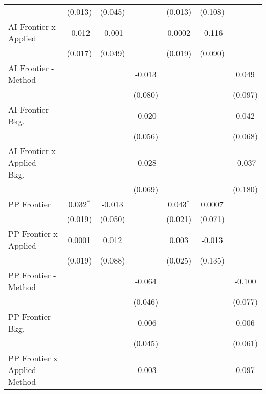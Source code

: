 \begin{tabular}{lcccccc}
                                  & (0.013)     & (0.045) &              & (0.013)      & (0.108) &   \\   
   AI Frontier x Applied          & -0.012      & -0.001  &              & 0.0002       & -0.116  &   \\   
                                  & (0.017)     & (0.049) &              & (0.019)      & (0.090) &   \\   
   AI Frontier - Method           &             &         & -0.013       &              &         & 0.049\\   
                                  &             &         & (0.080)      &              &         & (0.097)\\   
   AI Frontier - Bkg.             &             &         & -0.020       &              &         & 0.042\\   
                                  &             &         & (0.056)      &              &         & (0.068)\\   
   AI Frontier x Applied - Bkg.   &             &         & -0.028       &              &         & -0.037\\   
                                  &             &         & (0.069)      &              &         & (0.180)\\   
   PP Frontier                    & 0.032$^{*}$ & -0.013  &              & 0.043$^{*}$  & 0.0007  &   \\   
                                  & (0.019)     & (0.050) &              & (0.021)      & (0.071) &   \\   
   PP Frontier x Applied          & 0.0001      & 0.012   &              & 0.003        & -0.013  &   \\   
                                  & (0.019)     & (0.088) &              & (0.025)      & (0.135) &   \\   
   PP Frontier - Method           &             &         & -0.064       &              &         & -0.100\\   
                                  &             &         & (0.046)      &              &         & (0.077)\\   
   PP Frontier - Bkg.             &             &         & -0.006       &              &         & 0.006\\   
                                  &             &         & (0.045)      &              &         & (0.061)\\   
   PP Frontier x Applied - Method &             &         & -0.003       &              &         & 0.097\\   

\end{tabular}
